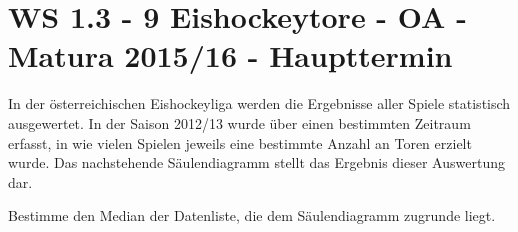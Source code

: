 \section{WS 1.3 - 9 Eishockeytore - OA - Matura 2015/16 - Haupttermin}

\begin{beispiel}[WS 1.3]{1} %
In der österreichischen Eishockeyliga werden die Ergebnisse aller Spiele statistisch ausgewertet. In der Saison 2012/13 wurde über einen bestimmten Zeitraum erfasst, in wie vielen Spielen jeweils eine bestimmte Anzahl an Toren erzielt wurde. Das nachstehende Säulendiagramm stellt das Ergebnis dieser Auswertung dar.


\begin{center}
\end{center}


Bestimme den Median der Datenliste, die dem Säulendiagramm zugrunde liegt.


\end{beispiel}